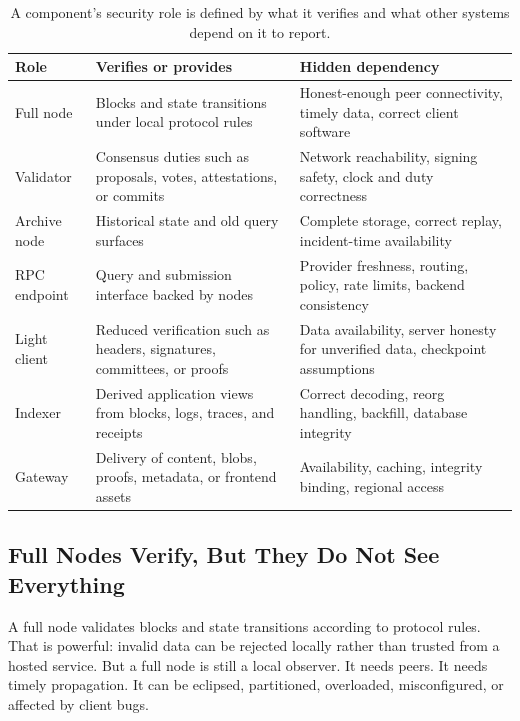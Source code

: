 \begin{table}[htbp]
\centering
\small
\renewcommand{\arraystretch}{1.16}
\begin{tabularx}{\textwidth}{@{}>{\RaggedRight\arraybackslash}p{}>{\RaggedRight\arraybackslash}p{}X@{}}
\toprule
Role & Verifies or provides & Hidden dependency \\
\midrule
Full node & Blocks and state transitions under local protocol rules & Honest-enough peer connectivity, timely data, correct client software \\
Validator & Consensus duties such as proposals, votes, attestations, or commits & Network reachability, signing safety, clock and duty correctness \\
Archive node & Historical state and old query surfaces & Complete storage, correct replay, incident-time availability \\
RPC endpoint & Query and submission interface backed by nodes & Provider freshness, routing, policy, rate limits, backend consistency \\
Light client & Reduced verification such as headers, signatures, committees, or proofs & Data availability, server honesty for unverified data, checkpoint assumptions \\
Indexer & Derived application views from blocks, logs, traces, and receipts & Correct decoding, reorg handling, backfill, database integrity \\
Gateway & Delivery of content, blobs, proofs, metadata, or frontend assets & Availability, caching, integrity binding, regional access \\
\bottomrule
\end{tabularx}
\caption{A component's security role is defined by what it verifies and what other systems depend on it to report.}
\end{table}

\subsection{Full Nodes Verify, But They Do Not See Everything}

A full node validates blocks and state transitions according to protocol rules. That is powerful: invalid data can be rejected locally rather than trusted from a hosted service. But a full node is still a local observer. It needs peers. It needs timely propagation. It can be eclipsed, partitioned, overloaded, misconfigured, or affected by client bugs.

